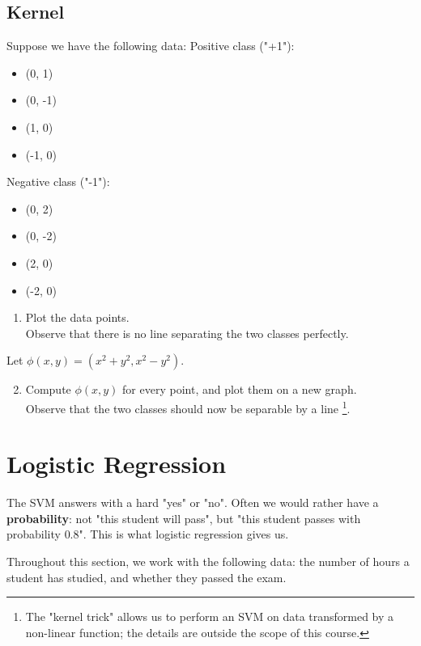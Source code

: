 \documentclass[]{article}
\begin{document}
	\subsection{Kernel}
	Suppose we have the following data:
	Positive class ("+1"):
	\begin{itemize}
		\item (0, 1)
		\item (0, -1)
		\item (1, 0)
		\item (-1, 0)
	\end{itemize}
	Negative class ("-1"):
	\begin{itemize}
		\item (0, 2)
		\item (0, -2)
		\item (2, 0)
		\item (-2, 0)
	\end{itemize}
	\begin{enumerate}
		\item Plot the data points.\\
		Observe that there is no line separating the two classes perfectly.
	\end{enumerate}

	\vspace{0.5cm}

	Let $\phi(x,y) = (x^2 + y^2, x^2-y^2)$.
	\begin{enumerate}
		\setcounter{enumi}{1}
		\item Compute $\phi(x,y)$ for every point, and plot them on a new graph.\\
		Observe that the two classes should now be separable by a line
		\footnote{
			The "kernel trick" allows us to perform an SVM on data transformed by a non-linear function; the details are outside the scope of this course.
		}.
	\end{enumerate}
	
	
	
	

	\section{Logistic Regression}

	The SVM answers with a hard "yes" or "no".
	Often we would rather have a \textbf{probability}: not "this student will pass", but "this student passes with probability $0.8$".
	This is what logistic regression gives us.

	Throughout this section, we work with the following data: the number of hours a student has studied, and whether they passed the exam.
\end{document}
